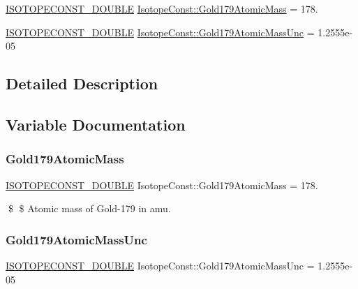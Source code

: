 \begin{DoxyCompactItemize}
\item 
\mbox{\hyperlink{group___isotope_const-_macros_ga8f45a7272ce02c0b4c65c44636ed719a}{I\+S\+O\+T\+O\+P\+E\+C\+O\+N\+S\+T\+\_\+\+D\+O\+U\+B\+LE}} \mbox{\hyperlink{group___isotope_const-_gold-_au179_ga829a710db063f83a2393d0d5f0337f68}{Isotope\+Const\+::\+Gold179\+Atomic\+Mass}} = 178.
\item 
\mbox{\hyperlink{group___isotope_const-_macros_ga8f45a7272ce02c0b4c65c44636ed719a}{I\+S\+O\+T\+O\+P\+E\+C\+O\+N\+S\+T\+\_\+\+D\+O\+U\+B\+LE}} \mbox{\hyperlink{group___isotope_const-_gold-_au179_gad0c90a4343daf41d272efa3b25aa0f2f}{Isotope\+Const\+::\+Gold179\+Atomic\+Mass\+Unc}} = 1.\+2555e-\/05
\end{DoxyCompactItemize}


\subsection{Detailed Description}


\subsection{Variable Documentation}
\mbox{\label{group___isotope_const-_gold-_au179_ga829a710db063f83a2393d0d5f0337f68}} 
\subsubsection{\texorpdfstring{Gold179\+Atomic\+Mass}{Gold179AtomicMass}}
{\footnotesize\ttfamily \mbox{\hyperlink{group___isotope_const-_macros_ga8f45a7272ce02c0b4c65c44636ed719a}{I\+S\+O\+T\+O\+P\+E\+C\+O\+N\+S\+T\+\_\+\+D\+O\+U\+B\+LE}} Isotope\+Const\+::\+Gold179\+Atomic\+Mass = 178.}

\$ \$ Atomic mass of Gold-\/179 in amu. \mbox{\label{group___isotope_const-_gold-_au179_gad0c90a4343daf41d272efa3b25aa0f2f}} 
\subsubsection{\texorpdfstring{Gold179\+Atomic\+Mass\+Unc}{Gold179AtomicMassUnc}}
{\footnotesize\ttfamily \mbox{\hyperlink{group___isotope_const-_macros_ga8f45a7272ce02c0b4c65c44636ed719a}{I\+S\+O\+T\+O\+P\+E\+C\+O\+N\+S\+T\+\_\+\+D\+O\+U\+B\+LE}} Isotope\+Const\+::\+Gold179\+Atomic\+Mass\+Unc = 1.\+2555e-\/05}

